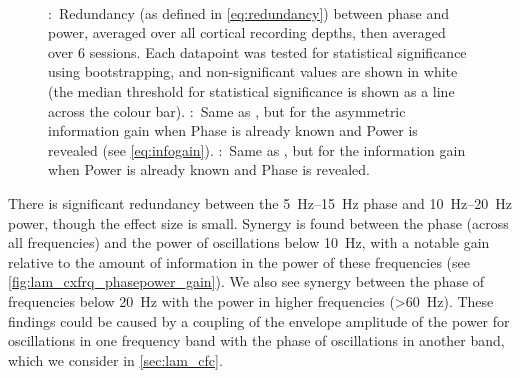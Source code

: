 \begin{figure}[htbp]
    \centering
    \\
    \hspace*{\fill}\hspace{.2cm}\hspace*{\fill}
    \hspace*{\fill}
    \caption{
\protect{}:~Redundancy (as defined in \autoref{eq:redundancy}) between phase and power, averaged over all cortical recording depths, then averaged over \num{6} sessions.
Each datapoint was tested for statistical significance using bootstrapping, and non-significant values are shown in white (the median threshold for statistical significance is shown as a line across the colour bar).
\protect{}:~Same as \protect{}, but for the asymmetric information gain when Phase is already known and Power is revealed (see \autoref{eq:infogain}).
\protect{}:~Same as \protect{}, but for the information gain when Power is already known and Phase is revealed.
}
\label{fig:lam_cxfrq_powerphase_info}
\end{figure}

There is significant redundancy between the \SIrange{5}{15}{Hz} phase and \SIrange{10}{20}{Hz} power, though the effect size is small.
Synergy is found between the phase (across all frequencies) and the power of oscillations below \SI{10}{Hz}, with a notable gain relative to the amount of information in the power of these frequencies (see \autoref{fig:lam_cxfrq_phasepower_gain}).
We also see synergy between the phase of frequencies below \SI{20}{Hz} with the power in higher frequencies (\SI{>60}{Hz}).
These findings could be caused by a coupling of the envelope amplitude of the power for oscillations in one frequency band with the phase of oscillations in another band, which we consider in \autoref{sec:lam_cfc}.

